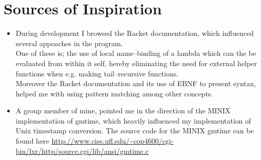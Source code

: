 \chapter{Sources of Inspiration}
\begin{itemize}
    \item During development I browsed the Racket documentation, which influenced several appoaches in the program.\\
        One of these is; the use of local name--binding of a lambda which can the be evaluated from within it self, hereby eliminating the need for external helper functions when e.g. making tail--recursive functions.\\
        Moreover the Racket documentation and its use of EBNF to present syntax, helped me with using pattern matching among other concepts.
    \item A group member of mine, pointed me in the direction of the MINIX implementation of gmtime, which heavily influenced my implementation of Unix timestamp conversion. The source code for the MINIX gmtime can be found here \url{http://www.cise.ufl.edu/~cop4600/cgi-bin/lxr/http/source.cgi/lib/ansi/gmtime.c}
\end{itemize}
